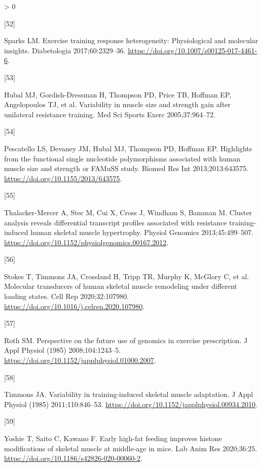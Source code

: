 \documentclass[twoside,10pt]{gihclass} %
\newlength{\cslhangindent}
\newlength{\csllabelwidth}
\newenvironment{CSLReferences}[3] %
 {%
  \setlength{\parindent}{0pt}
  \ifodd #1 \everypar{\setlength{\hangindent}{\cslhangindent}}\ignorespaces\fi
  \ifnum #2 > 0
  \setlength{\parskip}{#2\baselineskip}
  \fi
 }%
 {}
\newcommand{\CSLLeftMargin}[1]{\parbox[t]{\maxof{\widthof{#1}}{\csllabelwidth}}{#1}}
\newcommand{\CSLRightInline}[1]{\parbox[t]{\linewidth}{#1}}
\begin{document}
\begin{CSLReferences}{0}{0}
\leavevmode\hypertarget{ref-RN2677}{}%
\CSLLeftMargin{{[}52{]} }
\CSLRightInline{Sparks LM. Exercise training response heterogeneity: Physiological and molecular insights. Diabetologia 2017;60:2329--36. \url{https://doi.org/10.1007/s00125-017-4461-6}.}

\leavevmode\hypertarget{ref-RN764}{}%
\CSLLeftMargin{{[}53{]} }
\CSLRightInline{Hubal MJ, Gordish-Dressman H, Thompson PD, Price TB, Hoffman EP, Angelopoulos TJ, et al. Variability in muscle size and strength gain after unilateral resistance training. Med Sci Sports Exerc 2005;37:964--72.}

\leavevmode\hypertarget{ref-RN1263}{}%
\CSLLeftMargin{{[}54{]} }
\CSLRightInline{Pescatello LS, Devaney JM, Hubal MJ, Thompson PD, Hoffman EP. Highlights from the functional single nucleotide polymorphisms associated with human muscle size and strength or FAMuSS study. Biomed Res Int 2013;2013:643575. \url{https://doi.org/10.1155/2013/643575}.}

\leavevmode\hypertarget{ref-RN826}{}%
\CSLLeftMargin{{[}55{]} }
\CSLRightInline{Thalacker-Mercer A, Stec M, Cui X, Cross J, Windham S, Bamman M. Cluster analysis reveals differential transcript profiles associated with resistance training-induced human skeletal muscle hypertrophy. Physiol Genomics 2013;45:499--507. \url{https://doi.org/10.1152/physiolgenomics.00167.2012}.}

\leavevmode\hypertarget{ref-RN2684}{}%
\CSLLeftMargin{{[}56{]} }
\CSLRightInline{Stokes T, Timmons JA, Crossland H, Tripp TR, Murphy K, McGlory C, et al. Molecular transducers of human skeletal muscle remodeling under different loading states. Cell Rep 2020;32:107980. \url{https://doi.org/10.1016/j.celrep.2020.107980}.}

\leavevmode\hypertarget{ref-RN2698}{}%
\CSLLeftMargin{{[}57{]} }
\CSLRightInline{Roth SM. Perspective on the future use of genomics in exercise prescription. J Appl Physiol (1985) 2008;104:1243--5. \url{https://doi.org/10.1152/japplphysiol.01000.2007}.}

\leavevmode\hypertarget{ref-RN758}{}%
\CSLLeftMargin{{[}58{]} }
\CSLRightInline{Timmons JA. Variability in training-induced skeletal muscle adaptation. J Appl Physiol (1985) 2011;110:846--53. \url{https://doi.org/10.1152/japplphysiol.00934.2010}.}

\leavevmode\hypertarget{ref-RN2694}{}%
\CSLLeftMargin{{[}59{]} }
\CSLRightInline{Yoshie T, Saito C, Kawano F. Early high-fat feeding improves histone modifications of skeletal muscle at middle-age in mice. Lab Anim Res 2020;36:25. \url{https://doi.org/10.1186/s42826-020-00060-2}.}


\end{CSLReferences}
\end{document}
